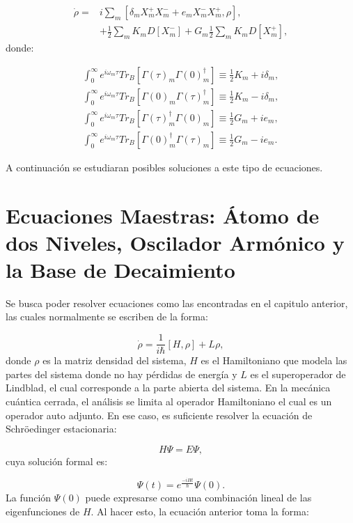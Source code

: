 \documentclass[a4paper,10pt]{report}
\begin{document}
\begin{align}
\dot{\rho} =& i\sum_m [\delta_m X^+_m X^-_m + e_mX^-_mX^+_m,\rho],\\
&+ \nonumber \frac{1}{2}\sum_m K_m D[X^-_m] + G_m\frac{1}{2}\sum_m K_m D[X^+_m],
\end{align} donde:

\begin{align}
\int_0 ^\infty e^{i\omega_m \tau}Tr_B[\Gamma(\tau)_m\Gamma(0)^\dagger_m] \equiv \frac{1}{2}K_m+i\delta_m,\\
\int_0 ^\infty e^{i\omega_m \tau}Tr_B[\Gamma(0)_m\Gamma(\tau)^\dagger_m]\equiv \frac{1}{2}K_m-i\delta_m,\\
\int_0 ^\infty e^{i\omega_m \tau}Tr_B[\Gamma(\tau)^\dagger_m\Gamma(0)_m]\equiv\frac{1}{2}G_m+ie_m,\\
\int_0 ^\infty e^{i\omega_m \tau}Tr_B[\Gamma(0)^\dagger_m\Gamma(\tau)_m]\equiv\frac{1}{2}G_m-ie_m.
\end{align}

A continuación se estudiaran posibles soluciones a este tipo de ecuaciones.


\chapter{Ecuaciones Maestras: Átomo de dos Niveles, Oscilador Armónico y la Base de Decaimiento}

Se busca poder resolver ecuaciones como las encontradas en el capitulo anterior, las cuales normalmente se escriben de la forma:

\begin{equation}\label{MasterEq}
\dot{\rho} = \frac{1}{i\hbar}[H,\rho] + L\rho,
\end{equation} donde $\rho$ es la matriz densidad del sistema, $H$ es el Hamiltoniano que modela las partes del sistema donde no hay pérdidas de energía y $L$ es el superoperador de Lindblad, el cual corresponde a la parte abierta del sistema. En la mecánica cuántica cerrada, el análisis se limita al operador Hamiltoniano el cual es un operador auto adjunto. En ese caso, es suficiente resolver la ecuación de Schröedinger estacionaria:

\begin{equation}
H\Psi = E\Psi,
\end{equation} cuya solución formal es:

\begin{equation}
\Psi(t) = e^{\frac{-iHt}{\hbar}}\Psi(0).
\end{equation} La función $\Psi(0)$ puede expresarse como una  combinación lineal de las eigenfunciones de $H$. Al hacer esto, la ecuación anterior toma la forma:
\end{document}
